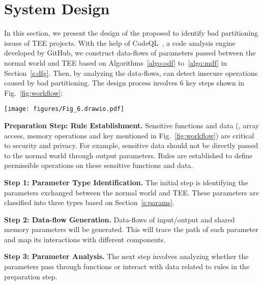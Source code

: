 \section{System Design} \label{s:design}
In this section, we present the design of the proposed \ccSysName to identify bad partitioning issues of TEE projects. With the help of CodeQL~\cite{10.1002/spe.3199, codeql}, a code analysis engine developed by GitHub, we construct data-flows of parameters passed between the normal world and TEE based on Algorithms~\ref{algo:odf} to~\ref{algo:mdf} in Section~\ref{s:dfg}. Then, by analyzing the data-flows, \ccSysName can detect insecure operations caused by bad partitioning. The design process involves 6 key steps shown in Fig.~\ref{fig:workflow}:

\begin{figure*}[t]
    \centering
    \texttt{[image: figures/Fig\_6.drawio.pdf]}
    \caption{Overview workflow of \ccSysName.}
    \label{fig:workflow}
\end{figure*}

\textbf{Preparation Step: Rule Establishment.} Sensitive functions and data (\eg, array access, memory operations and key mentioned in Fig.~\ref{fig:workflow}) are critical to security and privacy. For example, sensitive data should not be directly passed to the normal world through output parameters. Rules are established to define permissible operations on these sensitive functions and data.

\textbf{Step 1: Parameter Type Identification.} The initial step is identifying the parameters exchanged between the normal world and TEE. These parameters are classified into three types based on Section~\ref{s:params}.

\textbf{Step 2: Data-flow Generation.} Data-flows of input/output and shared memory parameters will be generated. This will trace the path of each parameter and map its interactions with different components.

\textbf{Step 3: Parameter Analysis.} The next step involves analyzing whether the parameters pass through functions or interact with data related to rules in the preparation step.

